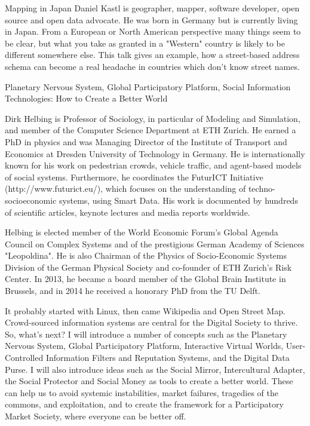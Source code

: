 %
{Mapping in Japan}%
{Daniel Kastl is geographer, mapper, software developer, open source and open data advocate. He was born in Germany but is currently living in Japan.}%
{From a European or North American perspective many things seem to be clear, but what you take as granted in a "Western" country is likely to be different somewhere else.
This talk gives an example, how a street-based address schema can become a real headache in countries which don't know street names.}

%
{Planetary Nervous System, Global Participatory Platform, Social Information 
Technologies: How to Create a Better World}%
{Dirk Helbing is Professor of Sociology, in particular of Modeling and 
Simulation, and member of the Computer Science Department at ETH Zurich. 
He earned a PhD in physics and was Managing Director of the Institute of 
Transport and Economics at Dresden University of Technology in Germany. 
He is internationally known for his work on pedestrian crowds, vehicle 
traffic, and agent-based models of social systems. Furthermore, he 
coordinates the FuturICT Initiative (http://www.futurict.eu/), which 
focuses on the understanding of techno-socioeconomic systems, using Smart 
Data. His work is documented by hundreds of scientific articles, keynote 
lectures and media reports worldwide. 

Helbing is elected member of the World Economic Forum's Global Agenda 
Council on Complex Systems and of the prestigious German Academy of 
Sciences "Leopoldina". He is also Chairman of the Physics of Socio-Economic 
Systems Division of the German Physical Society and co-founder of 
ETH Zurich’s Risk Center. In 2013, he became a board member of the 
Global Brain Institute in Brussels, and in 2014 he received a honorary 
PhD from the TU Delft.}%
{It probably started with Linux, then came Wikipedia and Open Street Map. 
Crowd-sourced information systems
are central for the Digital Society to thrive. So, what's next? 
I will introduce a number of concepts such as
the Planetary Nervous System, Global Participatory Platform, 
Interactive Virtual Worlds, User-Controlled
Information Filters and Reputation Systems, and the Digital Data Purse. 
I will also introduce ideas such as the Social Mirror, 
Intercultural Adapter, 
the Social Protector and Social Money as tools to create a better world. 
These can help us to avoid systemic instabilities, market failures, 
tragedies of the commons, and exploitation, and to create the framework 
for a Participatory Market Society, where everyone can be better off.}


